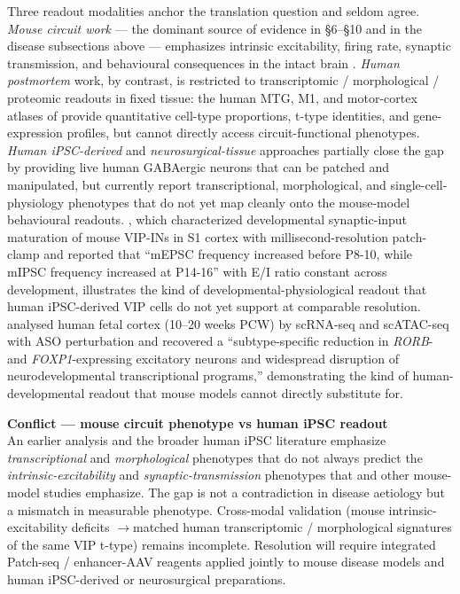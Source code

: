 \documentclass[11pt]{article}
\let\origrightarrow\rightarrow
\def\rightarrow{\ensuremath{\origrightarrow}}
\begin{document}
Three readout modalities anchor the translation question and seldom agree.
\textit{Mouse circuit work} --- the dominant source of evidence in §6--§10 and in
the disease subsections above --- emphasizes intrinsic excitability,
firing rate, synaptic transmission, and behavioural consequences in the
intact brain \citep{Goff2023, Mossner2020, Bhandari2024, Chen2023b, Rahmatullah2023}.
\textit{Human postmortem} work, by contrast, is restricted to
transcriptomic / morphological / proteomic readouts in fixed tissue: the
human MTG, M1, and motor-cortex atlases of
\citep{Hodge2019, Bakken2021a, Lake2018}
provide quantitative cell-type proportions, t-type identities, and
gene-expression profiles, but cannot directly access circuit-functional
phenotypes. \textit{Human iPSC-derived} and \textit{neurosurgical-tissue} approaches
\citep{Somogyi2025, Matthews2025} partially close the gap by
providing live human GABAergic neurons that can be patched and
manipulated, but currently report transcriptional, morphological, and
single-cell-physiology phenotypes that do not yet map cleanly onto the
mouse-model behavioural readouts. \citet{Simacek2025b}, which
characterized developmental synaptic-input maturation of mouse VIP-INs in
S1 cortex with millisecond-resolution patch-clamp and reported that
``mEPSC frequency increased before P8-10, while mIPSC frequency
increased at P14-16'' with E/I ratio constant across development,
illustrates the kind of developmental-physiological readout that human
iPSC-derived VIP cells do not yet support at comparable resolution.
\citet{Lattke2026} analysed human fetal cortex (10--20 weeks PCW) by
scRNA-seq and scATAC-seq with ASO perturbation and recovered a
``subtype-specific reduction in \textit{RORB}- and \textit{FOXP1}-expressing
excitatory neurons and widespread disruption of neurodevelopmental
transcriptional programs,'' demonstrating the kind of human-developmental
readout that mouse models cannot directly substitute for.

\begin{framed}
\textbf{Conflict --- mouse circuit phenotype vs human iPSC readout}\\
An earlier analysis and the broader human iPSC literature emphasize
\textit{transcriptional} and \textit{morphological} phenotypes that do not always
predict the \textit{intrinsic-excitability} and \textit{synaptic-transmission}
phenotypes that \citet{Goff2023} and other mouse-model studies
emphasize. The gap is not a contradiction in disease aetiology but a
mismatch in measurable phenotype. Cross-modal validation (mouse
intrinsic-excitability deficits \rightarrow matched human transcriptomic /
morphological signatures of the same VIP t-type) remains incomplete.
Resolution will require integrated Patch-seq / enhancer-AAV reagents
\citep{Lee2023a, Matthews2025} applied jointly to mouse disease models
and human iPSC-derived or neurosurgical preparations.
\end{framed}
\end{document}
